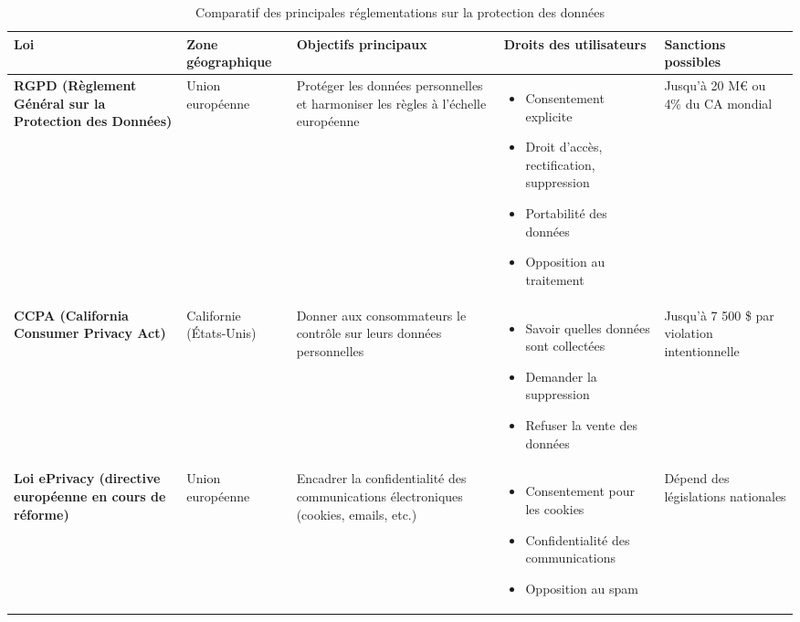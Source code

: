 \documentclass{article}
\begin{document}
\begin{table}[h!]
\centering
\small
\renewcommand{\arraystretch}{1.2}
\begin{tabular}{>{\bfseries}m{3.0cm} m{2.0cm} m{3.5cm} m{4.5cm} m{2.5cm}}
\toprule
Loi & Zone géographique & Objectifs principaux & Droits des utilisateurs & Sanctions possibles \\
\midrule
RGPD \newline (Règlement Général sur la Protection des Données) 
& Union européenne 
& Protéger les données personnelles et harmoniser les règles à l’échelle européenne 
& \begin{itemize}
    \item Consentement explicite
    \item Droit d'accès, rectification, suppression
    \item Portabilité des données
    \item Opposition au traitement
\end{itemize}
& Jusqu’à 20 M€ ou 4\% du CA mondial \\
\midrule
CCPA \newline (California Consumer Privacy Act) 
& Californie (États-Unis) 
& Donner aux consommateurs le contrôle sur leurs données personnelles 
& \begin{itemize}
    \item Savoir quelles données sont collectées
    \item Demander la suppression
    \item Refuser la vente des données
\end{itemize}
& Jusqu’à 7 500 \$ par violation intentionnelle \\
\midrule
Loi ePrivacy \newline (directive européenne en cours de réforme) 
& Union européenne 
& Encadrer la confidentialité des communications électroniques (cookies, emails, etc.) 
& \begin{itemize}
    \item Consentement pour les cookies
    \item Confidentialité des communications
    \item Opposition au spam
\end{itemize}
& Dépend des législations nationales \\
\bottomrule
\end{tabular}
\caption{Comparatif des principales réglementations sur la protection des données}
\end{table}
\end{document}
